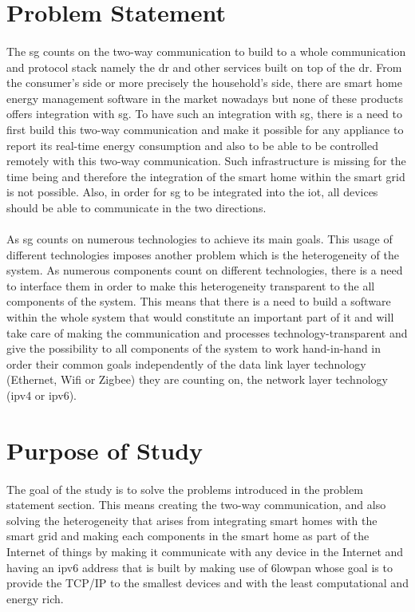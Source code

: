 \documentclass[oneside,12pt,a4paper,final]{book}
\begin{document}
\section{Problem Statement}
\paragraph{}
The  \gls{sg} counts on the two-way communication to build to a whole communication and protocol stack namely the \gls{dr} and other services built on top of the \gls{dr}. From the consumer's side or more precisely the household's side, there are smart home energy management software in the market nowadays but none of these products offers integration with \gls{sg}. To have such an integration with \gls{sg}, there is a need to first build this two-way communication and make it possible for any appliance to report its real-time energy consumption and also to be able to be controlled remotely with this two-way communication. Such infrastructure is missing for the time being and therefore the integration of the smart home within the smart grid is not possible. Also, in order for \gls{sg} to be integrated into the \gls{iot}, all devices should be able to communicate in the two directions.
\paragraph{}
As \gls{sg} counts on numerous technologies to achieve its main goals. This usage of different technologies imposes another problem which is the heterogeneity of the system. As numerous components count on different technologies, there is a need to interface them in order to make this heterogeneity transparent to the all components of the system. This means that there is a need to build a software within the whole system that would constitute an important part of it and will take care of making the communication and processes technology-transparent and give the possibility to all components of the system to work hand-in-hand in order their common goals independently of the data link layer technology (Ethernet, Wifi or Zigbee) they are counting on, the network layer technology (\gls{ipv4} or \gls{ipv6}).

\section{Purpose of Study}
 \paragraph{}
The goal of the study is to solve the problems introduced in the problem statement section. This means creating the two-way communication, and also solving the heterogeneity that arises from integrating smart homes with the smart grid and making each components in the smart home as part of the Internet of things by making it communicate with any device in the Internet and having an \gls{ipv6} address that is built by making use of \gls{6lowpan} whose goal is to provide the TCP/IP to the smallest devices and with the least computational and energy rich.
\end{document}
